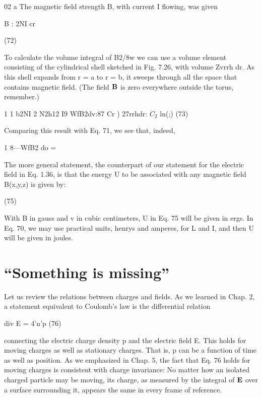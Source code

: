 02 a
The magnetic field strength B, with current I flowing, was given

\begin{equation}
\end{equation}
B : 2NI
cr

(72)

To calculate the volume integral of B2/8w we can use a volume element
consisting of the cylindrical shell sketched in Fig. 7.26, with
volume Zvrrh dr. As this shell expands from r = a to r = b, it sweeps
through all the space that contains magnetic field. (The field $\mathbf{B}$ is
zero everywhere outside the torus, remember.)

\begin{equation}
\end{equation}
1 1 b2NI 2 N2h12 I9
WfB2dv:87  Cr ) 27rrhdr: $C_2$ ln(;) (73)

Comparing this result with Eq. 71, we see that, indeed,

\begin{equation}
\end{equation}
1
8---WfB2 do = %

The more general statement, the counterpart of our statement for
the electric field in Eq. 1.36, is that the energy U to be associated with
any magnetic field B(x,y,z) is given by:

\begin{equation}
\end{equation}
(75)

 

With B in gauss and v in cubic centimeters, U in Eq. 75 will be given
in ergs. In Eq. 70, we may use practical units, henrys and amperes,
for L and I, and then U will be given in joules.

\section{``Something is missing''}

Let us review the relations between charges and fields. As we
learned in Chap. 2, a statement equivalent to Coulomb's law is the
differential relation

\begin{equation}
\end{equation}
div E = 4'n'p (76)

connecting the electric charge density p and the electric field E. This
holds for moving charges as well as stationary charges. That is, p can
be a function of time as well as position. As we emphasized in
Chap. 5, the fact that Eq. 76 holds for moving charges is consistent
with charge invariance: No matter how an isolated charged particle
may be moving, its charge, as measured by the integral of $\mathbf{E}$ over a
surface surrounding it, appears the same in every frame of reference.

